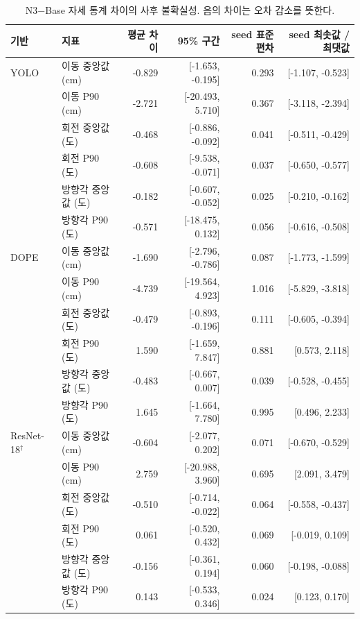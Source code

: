 \begin{table}[t]
\centering\footnotesize
\caption{N3−Base 자세 통계 차이의 사후 불확실성. 음의 차이는 오차 감소를 뜻한다.}
\label{sup:pose_uncertainty}
\setlength{\tabcolsep}{3pt}
\begin{tabularx}{\textwidth}{lYrrrr}
\toprule
기반 & 지표 & 평균 차이 & 95\% 구간 & seed 표준편차 & seed 최솟값 / 최댓값 \\
\midrule
YOLO & 이동 중앙값 (cm) & -0.829 & [-1.653, -0.195] & 0.293 & [-1.107, -0.523] \\
 & 이동 P90 (cm) & -2.721 & [-20.493, 5.710] & 0.367 & [-3.118, -2.394] \\
 & 회전 중앙값 (도) & -0.468 & [-0.886, -0.092] & 0.041 & [-0.511, -0.429] \\
 & 회전 P90 (도) & -0.608 & [-9.538, -0.071] & 0.037 & [-0.650, -0.577] \\
 & 방향각 중앙값 (도) & -0.182 & [-0.607, -0.052] & 0.025 & [-0.210, -0.162] \\
 & 방향각 P90 (도) & -0.571 & [-18.475, 0.132] & 0.056 & [-0.616, -0.508] \\
\midrule
DOPE & 이동 중앙값 (cm) & -1.690 & [-2.796, -0.786] & 0.087 & [-1.773, -1.599] \\
 & 이동 P90 (cm) & -4.739 & [-19.564, 4.923] & 1.016 & [-5.829, -3.818] \\
 & 회전 중앙값 (도) & -0.479 & [-0.893, -0.196] & 0.111 & [-0.605, -0.394] \\
 & 회전 P90 (도) & 1.590 & [-1.659, 7.847] & 0.881 & [0.573, 2.118] \\
 & 방향각 중앙값 (도) & -0.483 & [-0.667, 0.007] & 0.039 & [-0.528, -0.455] \\
 & 방향각 P90 (도) & 1.645 & [-1.664, 7.780] & 0.995 & [0.496, 2.233] \\
\midrule
ResNet-18$^{\dagger}$ & 이동 중앙값 (cm) & -0.604 & [-2.077, 0.202] & 0.071 & [-0.670, -0.529] \\
 & 이동 P90 (cm) & 2.759 & [-20.988, 3.960] & 0.695 & [2.091, 3.479] \\
 & 회전 중앙값 (도) & -0.510 & [-0.714, -0.022] & 0.064 & [-0.558, -0.437] \\
 & 회전 P90 (도) & 0.061 & [-0.520, 0.432] & 0.069 & [-0.019, 0.109] \\
 & 방향각 중앙값 (도) & -0.156 & [-0.361, 0.194] & 0.060 & [-0.198, -0.088] \\
 & 방향각 P90 (도) & 0.143 & [-0.533, 0.346] & 0.024 & [0.123, 0.170] \\
\bottomrule
\end{tabularx}
\end{table}
